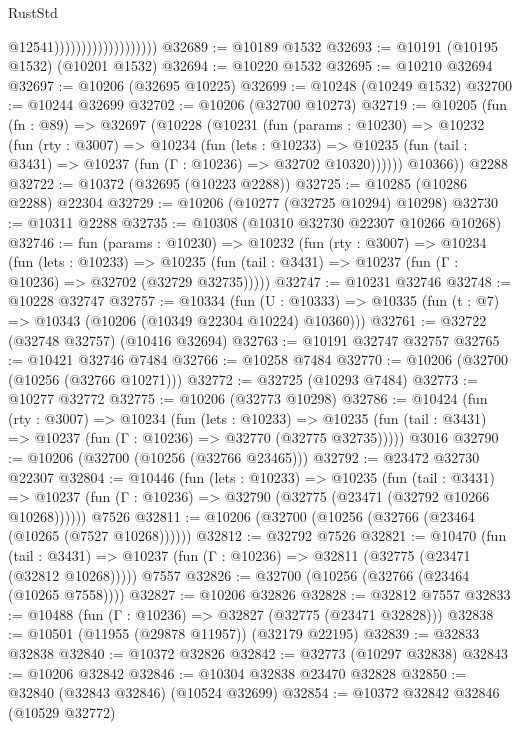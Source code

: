 \begin{lexlean}{RustStd}
\begin{coremodule}
                                          @12541)))))))))))))))))))
@32689 := @10189 @1532
@32693 := @10191 (@10195 @1532) (@10201 @1532)
@32694 := @10220 @1532
@32695 := @10210 @32694
@32697 := @10206 (@32695 @10225)
@32699 := @10248 (@10249 @1532)
@32700 := @10244 @32699
@32702 := @10206 (@32700 @10273)
@32719 := @10205
    (fun (fn : @89) =>
    @32697
      (@10228
        (@10231
          (fun (params : @10230) =>
          @10232
            (fun (rty : @3007) =>
            @10234
              (fun (lets : @10233) =>
              @10235 (fun (tail : @3431) => @10237 (fun (Γ : @10236) => @32702 @10320))))))
        @10366))
    @2288
@32722 := @10372 (@32695 (@10223 @2288))
@32725 := @10285 (@10286 @2288) @22304
@32729 := @10206 (@10277 (@32725 @10294) @10298)
@32730 := @10311 @2288
@32735 := @10308 (@10310 @32730 @22307 @10266 @10268)
@32746 := fun (params : @10230) =>
  @10232
    (fun (rty : @3007) =>
    @10234
      (fun (lets : @10233) =>
      @10235 (fun (tail : @3431) => @10237 (fun (Γ : @10236) => @32702 (@32729 @32735)))))
@32747 := @10231 @32746
@32748 := @10228 @32747
@32757 := @10334
    (fun (U : @10333) => @10335 (fun (t : @7) => @10343 (@10206 (@10349 @22304 @10224) @10360)))
@32761 := @32722 (@32748 @32757) (@10416 @32694)
@32763 := @10191 @32747 @32757
@32765 := @10421 @32746 @7484
@32766 := @10258 @7484
@32770 := @10206 (@32700 (@10256 (@32766 @10271)))
@32772 := @32725 (@10293 @7484)
@32773 := @10277 @32772
@32775 := @10206 (@32773 @10298)
@32786 := @10424
    (fun (rty : @3007) =>
    @10234
      (fun (lets : @10233) =>
      @10235 (fun (tail : @3431) => @10237 (fun (Γ : @10236) => @32770 (@32775 @32735)))))
    @3016
@32790 := @10206 (@32700 (@10256 (@32766 @23465)))
@32792 := @23472 @32730 @22307
@32804 := @10446
    (fun (lets : @10233) =>
    @10235
      (fun (tail : @3431) =>
      @10237 (fun (Γ : @10236) => @32790 (@32775 (@23471 (@32792 @10266 @10268))))))
    @7526
@32811 := @10206 (@32700 (@10256 (@32766 (@23464 (@10265 (@7527 @10268))))))
@32812 := @32792 @7526
@32821 := @10470
    (fun (tail : @3431) => @10237 (fun (Γ : @10236) => @32811 (@32775 (@23471 (@32812 @10268)))))
    @7557
@32826 := @32700 (@10256 (@32766 (@23464 (@10265 @7558))))
@32827 := @10206 @32826
@32828 := @32812 @7557
@32833 := @10488 (fun (Γ : @10236) => @32827 (@32775 (@23471 @32828)))
@32838 := @10501 (@11955 (@29878 @11957)) (@32179 @22195)
@32839 := @32833 @32838
@32840 := @10372 @32826
@32842 := @32773 (@10297 @32838)
@32843 := @10206 @32842
@32846 := @10304 @32838 @23470 @32828
@32850 := @32840 (@32843 @32846) (@10524 @32699)
@32854 := @10372 @32842 @32846 (@10529 @32772)

\end{coremodule}
\end{lexlean}
